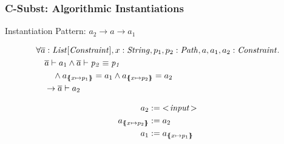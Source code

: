 \begin{frame}[t]
\frametitle{C-Subst: Algorithmic Instantiations}
Instantiation Pattern: $a_2 \rightarrow a \rightarrow a_1$

\begin{align*}
&\forall \overline{a}: \mathit{List[\mathit{Constraint}]}, x: \mathit{String}, p_1, p_2: \mathit{Path}, a, a_1, a_2: \mathit{Constraint}. \\
&\quad \overline{a} \vdash a_1
         \land \overline{a} \vdash \mathit{p_2} \equiv \mathit{p_1}\\
&\qquad  \land a_{\{\mskip-6.9mu\{ x \mapsto p_1 \}\mskip-6.9mu\}} = a_1 \land a_{\{\mskip-6.9mu\{ x \mapsto p_2 \}\mskip-6.9mu\}} = a_2\\
&\quad   \rightarrow \overline{a} \vdash a_2
\end{align*}

\begin{align*}
a_2 &:= \mIt{<\!input\!>}\\
a_{\sub{x}{p_2}} &:= a_2\\
a_1 &:= a_{\sub{x}{p_1}}
\end{align*}
\end{frame}

%

